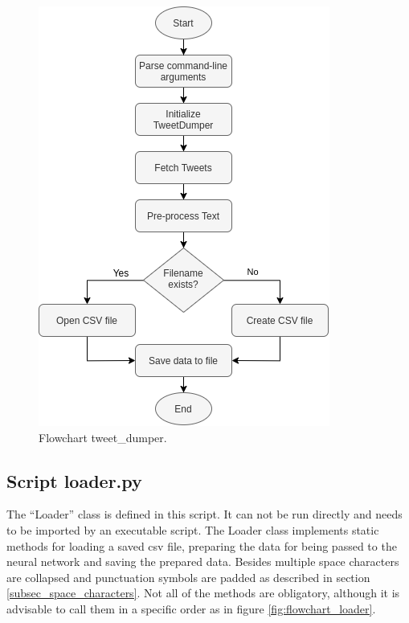 \documentclass[conference]{IEEEtran}
\begin{document}
\begin{figure}[htbp]
\centerline{\includegraphics[scale=0.61]{pictures/flowchart_tweet_dumper.png}}
\caption{Flowchart tweet\_dumper.}
\label{fig:flowchart_tweet_dumper}
\end{figure}

\subsection{Script loader.py}\label{subsec_loader}

The ``Loader'' class is defined in this script. It can not be run directly and needs to be imported by an executable script. The Loader class implements static methods for loading a saved csv file, preparing the data for being passed to the neural network and saving the prepared data. Besides multiple space characters are collapsed and punctuation symbols are padded as described in section \ref{subsec_space_characters}. Not all of the methods are obligatory, although it is advisable to call them in a specific order as in figure \ref{fig:flowchart_loader}. 
\end{document}
